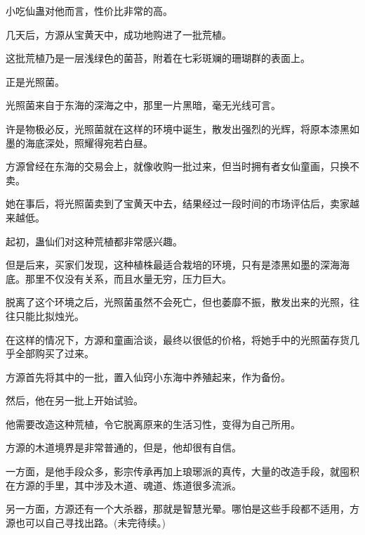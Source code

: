 \begin{this_body}
小吃仙蛊对他而言，性价比非常的高。

几天后，方源从宝黄天中，成功地购进了一批荒植。

这批荒植乃是一层浅绿色的菌苔，附着在七彩斑斓的珊瑚群的表面上。

正是光照菌。

光照菌来自于东海的深海之中，那里一片黑暗，毫无光线可言。

许是物极必反，光照菌就在这样的环境中诞生，散发出强烈的光辉，将原本漆黑如墨的海底深处，照耀得宛若白昼。

方源曾经在东海的交易会上，就像收购一批过来，但当时拥有者女仙童画，只换不卖。

她在事后，将光照菌卖到了宝黄天中去，结果经过一段时间的市场评估后，卖家越来越低。

起初，蛊仙们对这种荒植都非常感兴趣。

但是后来，买家们发现，这种植株最适合栽培的环境，只有是漆黑如墨的深海海底。那里不仅没有关系，而且水量无穷，压力巨大。

脱离了这个环境之后，光照菌虽然不会死亡，但也萎靡不振，散发出来的光照，往往只能比拟烛光。

在这样的情况下，方源和童画洽谈，最终以很低的价格，将她手中的光照菌存货几乎全部购买了过来。

方源首先将其中的一批，置入仙窍小东海中养殖起来，作为备份。

然后，他在另一批上开始试验。

他需要改造这种荒植，令它脱离原来的生活习性，变得为自己所用。

方源的木道境界是非常普通的，但是，他却很有自信。

一方面，是他手段众多，影宗传承再加上琅琊派的真传，大量的改造手段，就囤积在方源的手里，其中涉及木道、魂道、炼道很多流派。

另一方面，方源还有一个大杀器，那就是智慧光晕。哪怕是这些手段都不适用，方源也可以自己寻找出路。(未完待续。)

\end{this_body}


